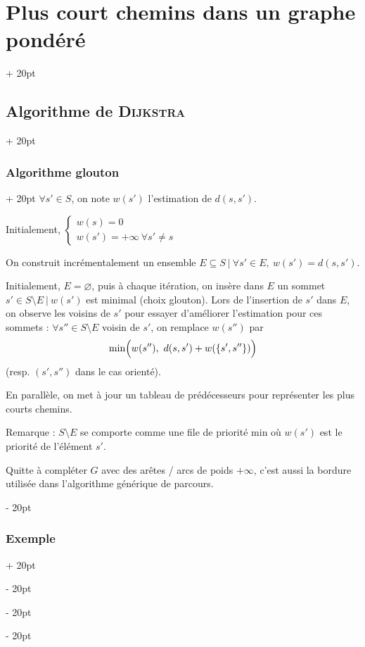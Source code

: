 \documentclass[a4paper, 12pt, twoside]{article}
\newcommand{\lr}[1]{\left( #1 \right)}
\newcommand{\set}[1]{\left\{ #1 \right\}}
\newcommand{\ind}[1][20pt]{\advance\leftskip + #1}
\newcommand{\deind}[1][20pt]{\advance\leftskip - #1}
\newenvironment{indt}[2][20pt]{#2 \par \ind[#1]}{\par \deind} %
\begin{document}
\begin{indt}{\section{Plus court chemins dans un graphe pondéré}}
\begin{indt}{\subsection{Algorithme de \textsc{Dijkstra}}}
            \begin{indt}{\subsubsection{Algorithme glouton}}
                $\forall s' \in S$, on note $w(s')$ l'estimation de $d(s, s')$.

                Initialement,
                $
                    \begin{cases}
                        w(s) = 0
                        \\
                        w(s') = +\infty\ \forall s' \neq s
                    \end{cases}
                $

                On construit incrémentalement un ensemble $E \subseteq S\ |\ \forall s' \in E,\ w(s') = d(s, s')$.

                Initialement, $E = \varnothing$, puis à chaque itération, on insère dans $E$ un sommet $s' \in S \setminus E\ |\ w(s')$ est minimal (choix glouton).
                Lors de l'insertion de $s'$ dans $E$, on observe les voisins de $s'$ pour essayer d'améliorer l'estimation pour ces sommets :
                $\forall s'' \in S \setminus E$ voisin de $s'$, on remplace $w(s'')$ par
                \[
                    \min\!\lr{ \vphantom{\frac a a} w(s''),\ d(s, s') + w(\set{s', s''})}
                \]
                (resp. $(s', s'')$ dans le cas orienté).

                En parallèle, on met à jour un tableau de prédécesseurs pour représenter les plus courts chemins.

                Remarque : $S \setminus E$ se comporte comme une file de priorité min où $w(s')$ est le priorité de l'élément $s'$.

                Quitte à compléter $G$ avec des arêtes / arcs de poids $+\infty$, c'est aussi la bordure utilisée dans l'algorithme générique de parcours.
            \end{indt}

            \vspace{12pt}
            
            \begin{indt}{\subsubsection{Exemple}}
                \begin{center}
\end{center}
\end{indt}
\end{indt}
\end{indt}
\end{document}
